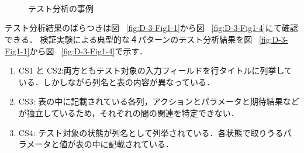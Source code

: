 \begin{figure}[H]
\centering
{}
\\
\\
\\
\caption{テスト分析の事例}
\label{fig:D-3-Fig1-1234}
\end{figure}


テスト分析結果のばらつきは図 ~\ref{fig:D-3-Fig1-1}から図 ~\ref{fig:D-3-Fig1-4}にて確認できる．
検証実験による典型的な４パターンのテスト分析結果を図 ~\ref{fig:D-3-Fig1-1}から図 ~\ref{fig:D-3-Fig1-4}で示す．
\begin{enumerate}
\item CS1 と CS2:両方ともテスト対象の入力フィールドを行タイトルに列挙している．しかしながら列名と表の内容が異なっている．
\item CS3: 表の中に記載されている各列，アクションとパラメータと期待結果などが独立しているため，それぞれの間の関連を特定できない．
\item CS4: テスト対象の状態が列名として列挙されている．各状態で取りうるパラメータと値が表の中に記載されている．
\end{enumerate}

